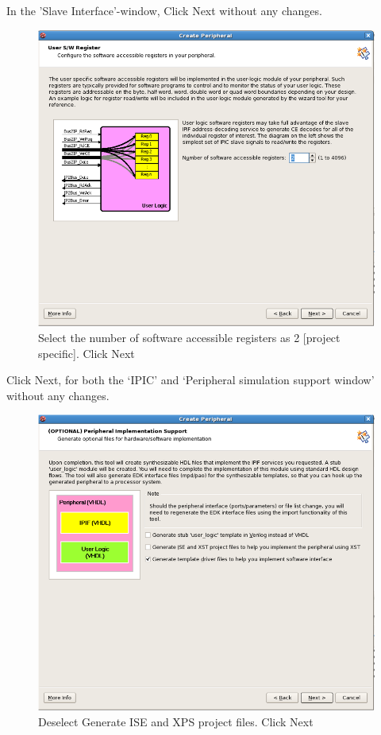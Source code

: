 \documentclass[a4paper,oneside]{memoir}
\begin{document}
In the 'Slave Interface'-window, Click Next without any changes.

\begin{figure}[H]
\centering
\includegraphics[scale=0.5]{step19}
\caption{Select the number of software accessible registers as 2 [project specific]. Click Next\label{fig:step19}}
\end{figure}

Click Next, for both the `IPIC' and `Peripheral simulation support window' without any changes.

\begin{figure}[H]
\centering
\includegraphics[scale=0.5]{step21}
\caption{Deselect Generate ISE and XPS project files. Click Next\label{fig:step21}}
\end{figure}
\end{document}
